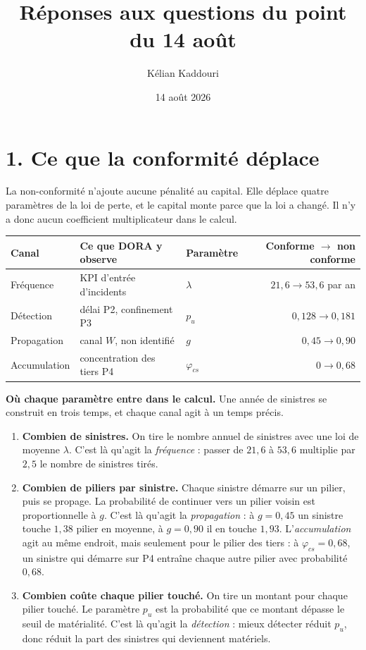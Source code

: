 \documentclass[11pt,a4paper]{article}
\title{\vspace{-1.4cm}\large\textbf{Réponses aux questions du point du 14 août}}
\author{\normalsize Kélian Kaddouri}
\date{\normalsize 14 août 2026}
\begin{document}
\maketitle
\vspace{-0.6cm}

\section*{1. Ce que la conformité déplace}

La non-conformité n'ajoute aucune pénalité au capital. Elle déplace quatre paramètres de la loi
de perte, et le capital monte parce que la loi a changé. Il n'y a donc aucun coefficient
multiplicateur dans le calcul.

\begin{center}
\begin{tabular}{@{}l l l r@{}}
\toprule
\textbf{Canal} & \textbf{Ce que DORA y observe} & \textbf{Paramètre} & \textbf{Conforme $\to$ non conforme} \\
\midrule
Fréquence & KPI d'entrée d'incidents & $\lambda$ & $21{,}6 \to 53{,}6$ par an \\
Détection & délai P2, confinement P3 & $p_u$ & $0{,}128 \to 0{,}181$ \\
Propagation & canal $W$, non identifié & $g$ & $0{,}45 \to 0{,}90$ \\
Accumulation & concentration des tiers P4 & $\varphi_{cs}$ & $0 \to 0{,}68$ \\
\bottomrule
\end{tabular}
\end{center}

\textbf{Où chaque paramètre entre dans le calcul.} Une année de sinistres se construit en trois
temps, et chaque canal agit à un temps précis.

\begin{enumerate}\itemsep1pt
\item \textbf{Combien de sinistres.} On tire le nombre annuel de sinistres avec une loi de
moyenne $\lambda$. C'est là qu'agit la \emph{fréquence} : passer de $21{,}6$ à $53{,}6$ multiplie
par $2{,}5$ le nombre de sinistres tirés.
\item \textbf{Combien de piliers par sinistre.} Chaque sinistre démarre sur un pilier, puis se
propage. La probabilité de continuer vers un pilier voisin est proportionnelle à $g$. C'est là
qu'agit la \emph{propagation} : à $g = 0{,}45$ un sinistre touche $1{,}38$ pilier en moyenne, à
$g = 0{,}90$ il en touche $1{,}93$. L'\emph{accumulation} agit au même endroit, mais seulement
pour le pilier des tiers : à $\varphi_{cs} = 0{,}68$, un sinistre qui démarre sur P4 entraîne
chaque autre pilier avec probabilité $0{,}68$.
\item \textbf{Combien coûte chaque pilier touché.} On tire un montant pour chaque pilier touché.
Le paramètre $p_u$ est la probabilité que ce montant dépasse le seuil de matérialité. C'est là
qu'agit la \emph{détection} : mieux détecter réduit $p_u$, donc réduit la part des sinistres qui
deviennent matériels.
\end{enumerate}
\end{document}
